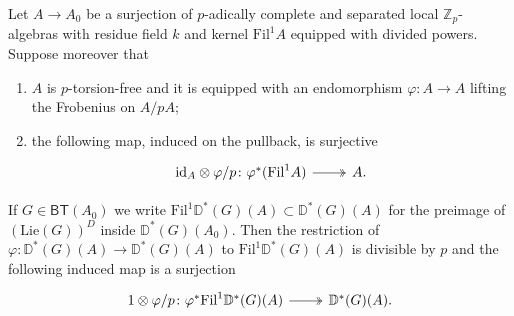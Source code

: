 \begin{lem}\label{lem:A2Kisin}
	Let $A \to A_0$ be a surjection of $p$-adically complete
	and separated local $\mathbb{Z}_{p}$-algebras with residue field
	$k$ and kernel $\mathrm{Fil}^1 A$ equipped with divided powers.
	Suppose moreover that
\begin{enumerate}
	\item $A$ is $p$-torsion-free and it is equipped with an endomorphism
		$\varphi\colon A \to A$ lifting the Frobenius on $A/pA$;
		
	\item the following map, induced on the pullback, is surjective
		\begin{equation*}
		\begin{tikzcd}
			\mathrm{id}_{ A } \otimes \varphi/p \colon
			\varphi^*(\mathrm{Fil}^1 A)
			\arrow[r, "", twoheadrightarrow] &
			A
		.\end{tikzcd}
		\end{equation*}
\end{enumerate}
	If $G \in \mathsf{BT}(A_0)$ we write $\mathrm{Fil}^1 \mathbb{D}^*(G)(A) \subset \mathbb{D}^*(G)(A)$
	for the preimage of $\left( \mathrm{Lie}(G) \right)^D$ inside $\mathbb{D}^*(G)(A_0)$.
	Then the restriction of $\varphi\colon \mathbb{D}^*(G)(A) \to \mathbb{D}^*(G)(A)$
	to $\mathrm{Fil}^1 \mathbb{D}^*(G)(A)$ is divisible by $p$ and the following induced map
	is a surjection
	\begin{equation*}
	\begin{tikzcd}
		1 \otimes \varphi/p \colon
		\varphi^*\mathrm{Fil}^1 \mathbb{D}^*(G)(A)
		\arrow[r, "", twoheadrightarrow] &
		\mathbb{D}^*(G)(A)
	.\end{tikzcd}
	\end{equation*}
\end{lem} 


